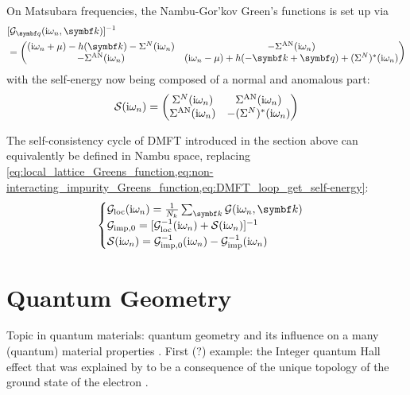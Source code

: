 \documentclass[../notes.tex]{subfiles}
\begin{document}
On Matsubara frequencies, the Nambu-Gor'kov Green's functions is set up via
\begin{align}
	&[\mathcal{G}_{\vb{q}} (\iu \omega_n, \vb{k})]^{-1} \\
	&= \begin{pmatrix}
		(\iu \omega_n + \mu) - h (\vb{k}) - \Sigma^{N} (\iu \omega_n) & -\Sigma^{\mathrm{AN}} (\iu \omega_n) \\
		-\Sigma^{\mathrm{AN}} (\iu \omega_n) & (\iu \omega_n - \mu) + h (-\vb{k} + \vb{q}) + (\Sigma^{N})^* (\iu \omega_n) \nonumber
	\end{pmatrix}
\end{align}
with the self-energy now being composed of a normal and anomalous part:
\begin{align}
	\mathcal{S} (\mathrm{i} \omega_n) = 
	\begin{pmatrix}
		\Sigma^{N} (\mathrm{i} \omega_n) & \Sigma^{\mathrm{AN}} (\mathrm{i} \omega_n) \\
		\Sigma^{\mathrm{AN}} (\mathrm{i} \omega_n) & -(\Sigma^{N})^* (\mathrm{i} \omega_n)
	\end{pmatrix}
\end{align}

The self-consistency cycle of DMFT introduced in the section above can equivalently be defined in Nambu space, replacing \cref{eq:local_lattice_Greens_function,eq:non-interacting_impurity_Greens_function,eq:DMFT_loop_get_self-energy}:
\begin{align}
	\begin{cases}
		\mathcal{G}_{\mathrm{loc}} (\iu \omega_n) = \frac{1}{N_k} \sum_{\vb{k}} \mathcal{G} (\iu \omega_n, \vb{k}) \\
		\mathcal{G}_{\mathrm{imp}, 0} = [\mathcal{G}_{\mathrm{loc}}^{-1} (\iu \omega_n) + \mathcal{S} (\iu \omega_n)]^{-1} \\
		\mathcal{S} (\iu \omega_n) = \mathcal{G}_{\mathrm{imp}, 0}^{-1} (\iu \omega_n) - \mathcal{G}_{\mathrm{imp}}^{-1} (\iu \omega_n)
	\end{cases}
\end{align}

\section{Quantum Geometry}\label{sec:quantum-metric}

Topic in quantum materials: quantum geometry and its influence on a many (quantum) material properties \cite{yuQuantumGeometryQuantum2024}.
First (?) example: the Integer quantum Hall effect \cite{klitzingNewMethodHighAccuracy1980} that was explained by \citeauthor{thoulessQuantizedHallConductance1982} to be a consequence of the unique topology of the ground state of the electron \cite{thoulessQuantizedHallConductance1982}.
\end{document}
